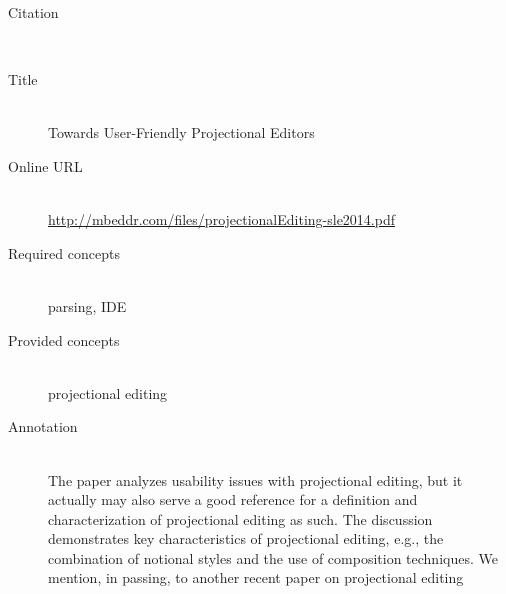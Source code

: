 \begin{description}
\item[Citation]\mbox{}\\
\cite{VolterSBK14}
\item[Title]\mbox{}\\
Towards User-Friendly Projectional Editors
\item[Online URL]\mbox{}\\
{\footnotesize\url{http://mbeddr.com/files/projectionalEditing-sle2014.pdf}}
\item[Required concepts]\mbox{}\\
parsing, IDE\item[Provided concepts]\mbox{}\\
projectional editing\item[Annotation]\mbox{}\\
The paper analyzes usability issues with projectional editing, but it actually may also serve a good reference for a definition and characterization of projectional editing as such. The discussion demonstrates key characteristics of projectional editing, e.g., the combination of notional styles and the use of composition techniques. We mention, in passing, to another recent paper on projectional editing~\cite{LorenzR11}
\end{description}

